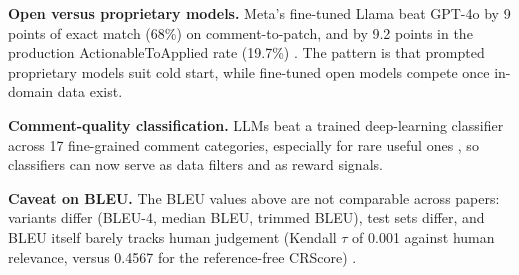 \textbf{Open versus proprietary models.} Meta's fine-tuned Llama beat GPT-4o by 9 points of exact match (68\%) on comment-to-patch, and by 9.2 points in the production ActionableToApplied rate (19.7\%) \cite{maddila2025aiassisted}. The pattern is that prompted proprietary models suit cold start, while fine-tuned open models compete once in-domain data exist.

\textbf{Comment-quality classification.} LLMs beat a trained deep-learning classifier across 17 fine-grained comment categories, especially for rare useful ones \cite{nguyen2025exploring}, so classifiers can now serve as data filters and as reward signals.

\textbf{Caveat on BLEU.} The BLEU values above are not comparable across papers: variants differ (BLEU-4, median BLEU, trimmed BLEU), test sets differ, and BLEU itself barely tracks human judgement (Kendall $\tau$ of 0.001 against human relevance, versus 0.4567 for the reference-free CRScore) \cite{naik2025crscore}.
